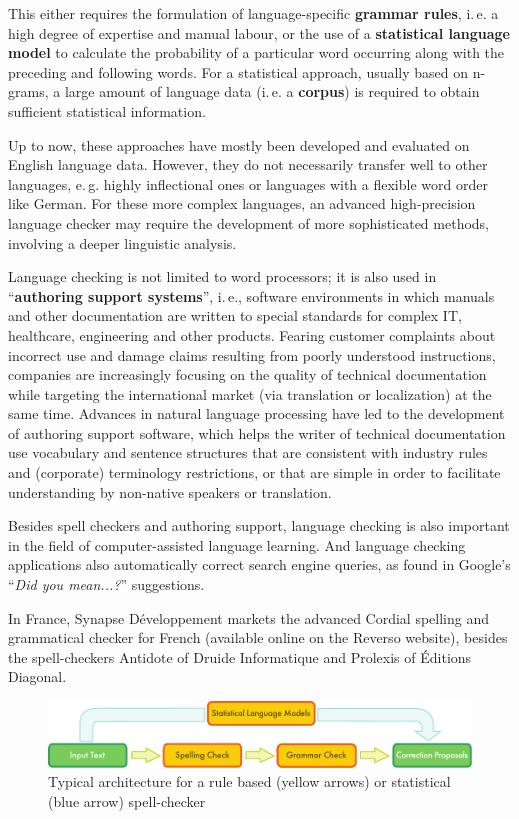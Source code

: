 \begin{multicols}{2}
This either requires the formulation of language-specific {\bf grammar
rules}, i.\,e. a high degree of expertise and manual labour, or the use
of a {\bf statistical language model} to calculate the probability of a
particular word occurring along with the preceding and following
words. For a statistical approach, usually based on n-grams, a large
amount of language data (i.\,e. a {\bf corpus}) is required to obtain
sufficient statistical information.  

Up to now, these approaches have mostly been developed and evaluated
on English language data. However, they do not necessarily transfer
well to other languages, e.\,g. highly inflectional ones or languages
with a flexible word order like German. For these more complex
languages, an advanced high-precision language checker may require the
development of more sophisticated methods, involving a deeper
linguistic analysis.

Language checking is not limited to word processors; it is also used
in ``{\bf authoring support systems}'', i.\,e., software environments in which
manuals and other documentation are written to special standards for
complex IT, healthcare, engineering and other products. Fearing
customer complaints about incorrect use and damage claims resulting
from poorly understood instructions, companies are increasingly
focusing on the quality of technical documentation while targeting the
international market (via translation or localization) at the same
time. Advances in natural language processing have led to the
development of authoring support software, which helps the writer of
technical documentation use vocabulary and sentence structures that
are consistent with industry rules and (corporate) terminology
restrictions, or that are simple in order to facilitate understanding
by non-native speakers or translation.

Besides spell checkers and authoring support, language checking is
also important in the field of computer-assisted language
learning. And language checking applications also automatically
correct search engine queries, as found in Google's ``{\em Did you mean...?}''
suggestions.

In France, Synapse Développement markets the advanced Cordial spelling
and grammatical checker for French (available online on the Reverso
website), besides the spell-checkers Antidote of Druide Informatique
and Prolexis of Éditions Diagonal.

\begin{figure}[!ht]
\begin{center}
  \includegraphics[width=\textwidth]{../_media/english/language_checking}
\caption{Typical architecture for a rule based (yellow arrows) or statistical (blue arrow) spell-checker}
\label{fig:spellcheckerEn}
\end{center}
\end{figure}


\end{multicols}
